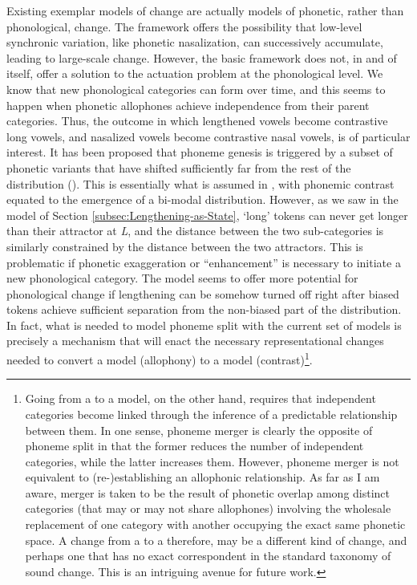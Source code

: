 Existing exemplar models of change are actually models of phonetic,
rather than phonological, change. The framework offers the possibility
that low-level synchronic variation, like phonetic nasalization, can
successively accumulate, leading to large-scale change. However, the
basic framework does not, in and of itself, offer a solution to the
actuation problem at the phonological level. We know that new phonological
categories can form over time, and this seems to happen when phonetic
allophones achieve independence from their parent categories. Thus,
the outcome in which lengthened vowels become contrastive long vowels,
and nasalized vowels become contrastive nasal vowels, is of particular
interest. It has been proposed that phoneme genesis is triggered by
a subset of phonetic variants that have shifted sufficiently far from
the rest of the distribution (\citealt{Janda2003,Janda2008}). This
is essentially what is assumed in \citet{Wedel2008}, with phonemic
contrast equated to the emergence of a bi-modal distribution. However,
as we saw in the  model of Section \ref{subsec:Lengthening-as-State},
`long' tokens can never get longer than their attractor at \emph{L},
and the distance between the two sub-categories is similarly constrained
by the distance between the two attractors. This is problematic if
phonetic exaggeration or “enhancement” is necessary to initiate
a new phonological category. The  model seems to offer
more potential for phonological change if lengthening can be somehow
turned off right after biased tokens achieve sufficient separation
from the non-biased part of the distribution. In fact, what is needed
to model phoneme split with the current set of models is precisely
a mechanism that will enact the necessary representational changes
needed to convert a  model (allophony) to a 
model (contrast)\footnote{Going from a  to a  model, on the other
hand, requires that independent categories become linked through the
inference of a predictable relationship between them. In one sense,
phoneme merger is clearly the opposite of phoneme split in that the
former reduces the number of independent categories, while the latter
increases them. However, phoneme merger is not equivalent to (re-)establishing
an allophonic relationship. As far as I am aware, merger is taken
to be the result of phonetic overlap among distinct categories (that
may or may not share allophones) involving the wholesale replacement
of one category with another occupying the exact same phonetic space.
A change from a  to a  therefore, may be
a different kind of change, and perhaps one that has no exact correspondent
in the standard taxonomy of sound change. This is an intriguing avenue
for future work.}.

